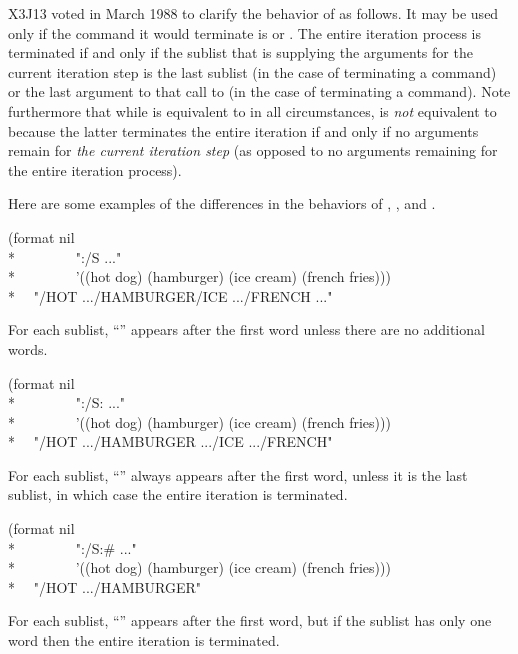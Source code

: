 \begin{flushdesc}
\begin{new}
X3J13 voted in March 1988
to clarify the behavior of \cd{{\Xtilde}:{\Xcircumflex}} as follows.
It may be used only if the command it would terminate is \cd{{\Xtilde}:{\Xlbrace}}
or \cd{{\Xtilde}:{\Xatsign}{\Xlbrace}}.  The entire iteration process is terminated
if and only if the sublist that is supplying the arguments for the current iteration step
is the last sublist (in the case of terminating a \cd{{\Xtilde}:{\Xlbrace}} command)
or the last argument to that call to  (in the
case of terminating a \cd{{\Xtilde}:{\Xatsign}{\Xlbrace}} command).
Note furthermore that while \cd{{\Xtilde}{\Xcircumflex}} is equivalent
to \cd{{\Xtilde}\#{\Xcircumflex}} in all circumstances,
\cd{{\Xtilde}:{\Xcircumflex}} is \emph{not} equivalent
to \cd{{\Xtilde}:\#{\Xcircumflex}} because the latter terminates the entire iteration
if and only if no arguments remain for \emph{the current iteration step}
(as opposed to no arguments remaining for the entire iteration process).

Here are some examples of the differences in the
behaviors of \cd{{\Xtilde}{\Xcircumflex}}, \cd{{\Xtilde}:{\Xcircumflex}},
and \cd{{\Xtilde}:\#{\Xcircumflex}}.
\begin{lisp}
(format nil \\*
~~~~~~~~"{\Xtilde}:{\Xlbrace}/{\Xtilde}S{\Xtilde}{\Xcircumflex} ...{\Xtilde}{\Xrbrace}" \\*
~~~~~~~~'((hot dog) (hamburger) (ice cream) (french fries))) \\*
~\EV~"/HOT .../HAMBURGER/ICE .../FRENCH ..."
\end{lisp}
For each sublist, ``'' appears after the first word unless there are no
additional words.
\begin{lisp}
(format nil \\*
~~~~~~~~"{\Xtilde}:{\Xlbrace}/{\Xtilde}S{\Xtilde}:{\Xcircumflex} ...{\Xtilde}{\Xrbrace}" \\*
~~~~~~~~'((hot dog) (hamburger) (ice cream) (french fries))) \\*
~\EV~"/HOT .../HAMBURGER .../ICE .../FRENCH"
\end{lisp}
For each sublist, ``'' always appears after the first word, unless it is the
last sublist, in which case the entire iteration is terminated.
\begin{lisp}
(format nil \\*
~~~~~~~~"{\Xtilde}:{\Xlbrace}/{\Xtilde}S{\Xtilde}:\#{\Xcircumflex} ...{\Xtilde}{\Xrbrace}" \\*
~~~~~~~~'((hot dog) (hamburger) (ice cream) (french fries))) \\*
~\EV~"/HOT .../HAMBURGER"
\end{lisp}
For each sublist, ``'' appears after the first word, but if the sublist
has only one word then the entire iteration is terminated.
\end{new}


\end{flushdesc}
